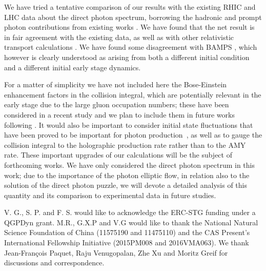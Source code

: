 \documentclass[aps,prc,a4paper,nofootinbib,
preprintnumbers,superscriptaddress,twocolumn,showpacs,showkeys]{revtex4}
\begin{document}
We have tried a tentative comparison of our results with the existing RHIC and LHC data about 
the direct photon spectrum, borrowing the hadronic and prompt photon contributions
from existing works \cite{Linnyk:2015tha}. We have found that the net result is in fair agreement
with the existing data, as well as with other relativistic transport calculations \cite{Linnyk:2015tha,Greif:2016jeb}. 
We have found some disagreement with BAMPS \cite{Greif:2016jeb}, which however is clearly understood
as arising from both a different initial condition and a different initial early stage dynamics. 

For a matter of simplicity we have not included here the 
Bose-Einstein enhancement factors in the collision integral, which are potentially relevant
in the early stage due to the large gluon occupation numbers; these have been considered in 
a recent study \cite{Berges:2017eom} and we plan to include them in future works 
following \cite{Scardina:2014gxa}.
It would also be important to consider initial state fluctuations that have been proved to
be important for photon production~\cite{Chatterjee:2013naa,Chatterjee:2012dn},
as well as to gauge the collision integral to the holographic production rate \cite{Iatrakis:2016ugz}
rather than to the AMY rate. 
These important upgrades of our calculations will be the subject of forthcoming works.
We have only considered the direct photon spectrum in this work; due to the importance of the photon elliptic flow, in relation also to the solution of the direct photon puzzle, we will devote a detailed analysis of this quantity and its comparison to experimental data in future studies.



\begin{acknowledgements}
V. G., S. P. and F. S. would like to acknowledge the ERC-STG funding under a QGPDyn grant. 
M.R., G.X.P and V.G would like to thank the National Natural Science Foundation of China (11575190 and 11475110) and the CAS Present’s International Fellowship Initiative (2015PM008 and 2016VMA063). 
We thank Jean-Fran\c{c}ois Paquet, Raju Venugopalan, Zhe Xu and Moritz Greif for discussions and correspondence.
\end{acknowledgements}
\end{document}
